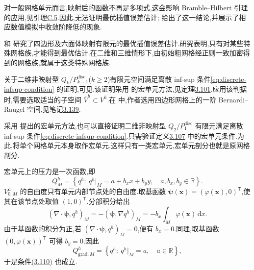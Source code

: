 \begin{note}\label{note:mapped-qk-interpolation-error}
对一般网格单元而言,映射后的函数不再是多项式,这会影响 Bramble--Hilbert 引理的应用,见引理\hyperref[lem:appendix-c-5]{C.5}.因此,无法证明最优插值误差估计;\textcite{ArnoldBoffiFalk2002} 给出了这一结论,并展示了相应数值模拟中收敛阶降低的现象.

\textcite{ArnoldBoffiFalk2002} 和\textcite{Matthies2001} 研究了四边形及六面体映射有限元的最优插值误差估计.研究表明,只有对某些特殊网格族,才能得到最优估计.在二维和三维情形下,由初始粗网格经正则一致加密得到的网格族,就属于这类特殊网格族.
\end{note}

\begin{note}\label{note:unmapped-qk-pdisc-2d}
关于二维非映射型 $Q_k/P_{k-1}^{\mathrm{disc}}$($k\ge2$)有限元空间满足离散 inf-sup 条件\cref{eq:discrete-infsup-condition} 的证明,可见\textcite[第 II 章,定理 3.2]{GiraultRaviart1986}.该证明采用\textcite{BolandNicolaides1983} 的宏单元方法,见定理\hyperref[thm:boland-nicolaides-macroelement-criterion]{3.101}.应用该判据时,需要选取适当的子空间 $\overline V^h\subset V^h$.在\textcite{GiraultRaviart1986} 中,作者选用四边形网格上的一阶 Bernardi--Raugel 空间,见笔记\hyperref[note:bernardi-raugel-quadrilaterals]{3.139}.
\end{note}

\begin{example}\label{ex:unmapped-q2-p1}
采用\textcite{Stenberg1984} 提出的宏单元方法,也可以直接证明二维非映射型 $Q_2/P_1^{\mathrm{disc}}$ 有限元满足离散 inf-sup 条件\cref{eq:discrete-infsup-condition}.只需验证定义\hyperref[def:macroelement-condition]{3.107} 中的宏单元条件.为此,将单个网格单元本身取作宏单元.这样只有一类宏单元,宏单元剖分也就是原网格剖分.

宏单元上的压力是一次函数,即
\[
  Q_M^h=\left\{q^h:\ q^h|_M=a+b_xx+b_yy,\quad
         a,b_x,b_y\in\mathbb{R}\right\}.
\]
$V_{0,M}^h$ 的自由度只有单元内部节点处的自由度.取基函数
$\symbf{\psi}(\bm{x})=(\varphi(\bm{x}),0)^\mathsf{T}$,使其在该节点处取值 $(1,0)^\mathsf{T}$.分部积分给出
\[
  (\nabla\cdot\symbf{\psi},q^h)_M
  =-(\symbf{\psi},\nabla q^h)_M
  =-b_x\int_M\varphi(\bm{x})\,\mathrm{d}x.
\]
由于基函数的积分为正,若 $(\nabla\cdot\symbf{\psi},q^h)_M=0$,便有 $b_x=0$.同理,取基函数 $(0,\varphi(\bm{x}))^\mathsf{T}$ 可得 $b_y=0$.因此
\[
  Q_{\mathrm{grad},M}^h
   =\left\{q^h:\ q^h|_M=a,\quad a\in\mathbb{R}\right\},
\]
于是条件\hyperref[eq:macroelement-condition]{(3.110)} 也成立.
\end{example}

